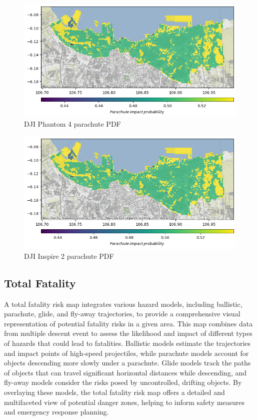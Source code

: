 \documentclass[12pt]{report}
\begin{document}
        \begin{figure}[H]
            \centering
            \includegraphics[width=\textwidth]{Plot/phantom4/parachute_pdf.png}
            \caption{DJI Phantom 4 parachute PDF}
        \end{figure}
        \begin{figure}[H]
            \centering
            \includegraphics[width=\textwidth]{Plot/inspire/parachute_pdf.png}
            \caption{DJI Inspire 2 parachute PDF}
        \end{figure}

        \subsection{Total Fatality}
        A total fatality risk map integrates various hazard models, including ballistic, parachute, glide, and fly-away
        trajectories, to provide a comprehensive visual representation of potential fatality risks in a given area. This
        map combines data from multiple descent event to assess the likelihood and impact of different types of hazards
        that could lead to fatalities. Ballistic models estimate the trajectories and impact points of high-speed
        projectiles, while parachute models account for objects descending more slowly under a parachute. Glide models
        track the paths of objects that can travel significant horizontal distances while descending, and fly-away
        models consider the risks posed by uncontrolled, drifting objects. By overlaying these models, the total
        fatality risk map offers a detailed and multifaceted view of potential danger zones, helping to inform safety
        measures and emergency response planning.
\end{document}
